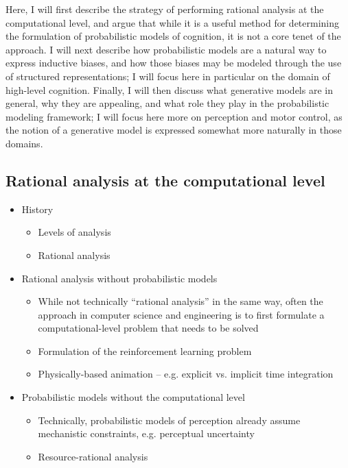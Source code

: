 \documentclass[12pt]{article}
\begin{document}
Here, I will first describe the strategy of performing rational analysis at the computational level, and argue that while it is a useful method for determining the formulation of probabilistic models of cognition, it is not a core tenet of the approach.
I will next describe how probabilistic models are a natural way to express inductive biases, and how those biases may be modeled through the use of structured representations; I will focus here in particular on the domain of high-level cognition.
Finally, I will then discuss what generative models are in general, why they are appealing, and what role they play in the probabilistic modeling framework; I will focus here more on perception and motor control, as the notion of a generative model is expressed somewhat more naturally in those domains.

\subsection*{Rational analysis at the computational level}

\begin{itemize}
\item History
    \begin{itemize}
    \item Levels of analysis \citep{Marr1971}
    \item Rational analysis \citep{Anderson1990}
    \end{itemize}

\item Rational analysis without probabilistic models
    \begin{itemize}
    \item While not technically ``rational analysis'' in the same way, often the approach in computer science and engineering is to first formulate a computational-level problem that needs to be solved
    \item Formulation of the reinforcement learning problem \citep{Sutton1998}
    \item Physically-based animation -- e.g. explicit vs. implicit time integration \citep{Witkin1997,Nealen2006}
    \end{itemize}

\item Probabilistic models without the computational level
    \begin{itemize}
    \item Technically, probabilistic models of perception already assume mechanistic constraints, e.g. perceptual uncertainty \citep{Weiss2002,Battaglia2012}
    \item Resource-rational analysis \citep{Lieder2012,Vul2014,Griffiths2015}
    \end{itemize}

\end{itemize}
\end{document}
